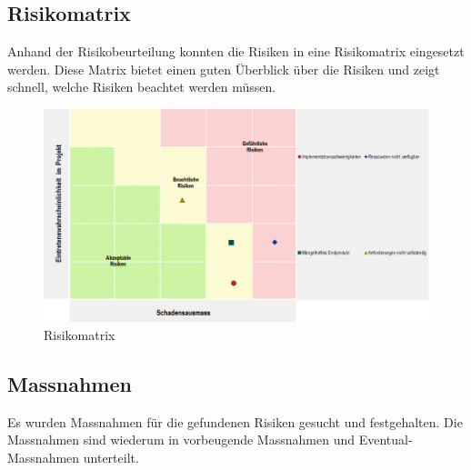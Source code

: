 \subsection{Risikomatrix}
Anhand der Risikobeurteilung konnten die Risiken in eine Risikomatrix eingesetzt werden. Diese Matrix bietet einen guten Überblick über die Risiken und zeigt schnell, welche Risiken beachtet werden müssen.
\begin{figure}[h]
\centering
\includegraphics[scale=0.5]{images/excel/risikomatrix.png}
\caption{Risikomatrix}
\label{fig:risikomatrix}
\end{figure}

\subsection{Massnahmen}
Es wurden Massnahmen für die gefundenen Risiken gesucht und festgehalten. Die Massnahmen sind wiederum in vorbeugende Massnahmen und Eventual-Massnahmen unterteilt.

